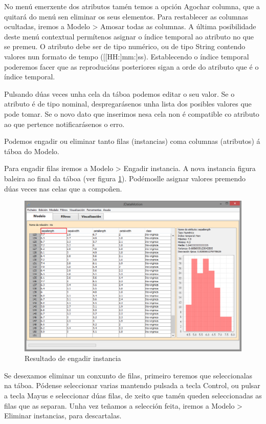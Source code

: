 No menú emerxente dos atributos tamén temos a opción Agochar columna, que a quitará do menú sen eliminar os seus elementos. Para restablecer as columnas ocultadas, iremos a Modelo \textgreater{} Amosar todas as columnas. A última posibilidade deste menú contextual permítenos asignar o índice temporal ao atributo no que se premeu. O atributo debe ser de tipo numérico, ou de tipo String contendo valores nun formato de tempo ([[HH:]mm:]ss). Establecendo o índice temporal poderemos facer que as reproducións posteriores sigan a orde do atributo que é o índice temporal.

Pulsando dúas veces unha cela da táboa podemos editar o seu valor. Se o atributo é de tipo nominal, despregarásenos unha lista dos posibles valores que pode tomar. Se o novo dato que inserimos nesa cela non é compatible co atributo ao que pertence notificarásenos o erro.

Podemos engadir ou eliminar tanto filas (instancias) coma columnas (atributos) á táboa do Modelo.

Para engadir filas iremos a Modelo \textgreater{} Engadir instancia. A nova instancia figura baleira ao final da táboa (ver figura \ref{engadirInstancia}). Podémoslle asignar valores premendo dúas veces nas celas que a compoñen.

\begin{figure}
\centering
\includegraphics[width=\textwidth,height=\textheight,keepaspectratio]{figuras/engadirInstancia}
\caption{Resultado de engadir instancia}
\label{engadirInstancia}
\end{figure}

Se desexamos eliminar un conxunto de filas, primeiro teremos que seleccionalas na táboa. Pódense seleccionar varias mantendo pulsada a tecla Control, ou pulsar a tecla Mayus e seleccionar dúas filas, de xeito que tamén queden seleccionadas as filas que as separan. Unha vez teñamos a selección feita, iremos a Modelo \textgreater{} Eliminar instancias, para descartalas.

